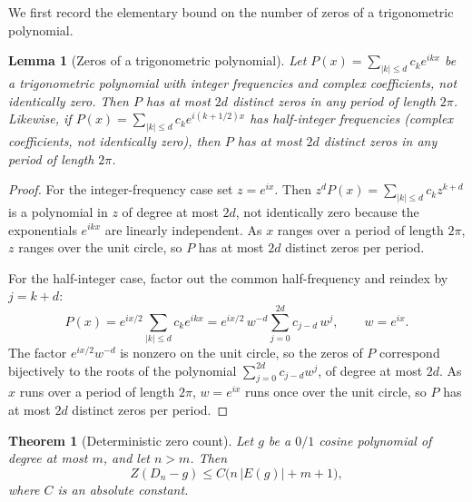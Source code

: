 \documentclass[11pt,reqno]{amsart}
\theoremstyle{plain}
\newtheorem{theorem}{Theorem}
\newtheorem{lemma}{Lemma}
\theoremstyle{definition}
\theoremstyle{remark}
\begin{document}
We first record the elementary bound on the number of zeros of a trigonometric polynomial.

\begin{lemma}[Zeros of a trigonometric polynomial]\label{lem:trigzeros}
Let $P(x)=\sum_{\lvert k\rvert\le d}c_k e^{ikx}$ be a trigonometric polynomial with
integer frequencies and complex coefficients, not identically zero. Then $P$ has at most
$2d$ distinct zeros in any period of length $2\pi$. Likewise, if
$P(x)=\sum_{\lvert k\rvert\le d}c_k e^{i(k+1/2)x}$ has half-integer frequencies (complex
coefficients, not identically zero), then $P$ has at most $2d$ distinct zeros in any
period of length $2\pi$.
\end{lemma}

\begin{proof}
For the integer-frequency case set $z=e^{ix}$. Then
$z^{d}P(x)=\sum_{\lvert k\rvert\le d}c_k z^{k+d}$ is a polynomial in $z$ of degree at
most $2d$, not identically zero because the exponentials $e^{ikx}$ are linearly
independent. As $x$ ranges over a period of length $2\pi$, $z$ ranges over the unit
circle, so $P$ has at most $2d$ distinct zeros per period.

For the half-integer case, factor out the common half-frequency and reindex by $j=k+d$:
\[
P(x)=e^{ix/2}\sum_{\lvert k\rvert\le d}c_k e^{ikx}
     =e^{ix/2}\,w^{-d}\sum_{j=0}^{2d}c_{j-d}\,w^{j},
\qquad w=e^{ix}.
\]
The factor $e^{ix/2}w^{-d}$ is nonzero on the unit circle, so the zeros of $P$
correspond bijectively to the roots of the polynomial
$\sum_{j=0}^{2d}c_{j-d}w^{j}$, of degree at most $2d$. As $x$ runs over a period of
length $2\pi$, $w=e^{ix}$ runs once over the unit circle, so $P$ has at most $2d$
distinct zeros per period.
\end{proof}

\begin{theorem}[Deterministic zero count]\label{thm:detcount}
Let $g$ be a $0/1$ cosine polynomial of degree at most $m$, and let $n>m$. Then
\[
  Z(D_n-g)\le C\bigl(n\,|E(g)|+m+1\bigr),
\]
where $C$ is an absolute constant.
\end{theorem}
\end{document}
